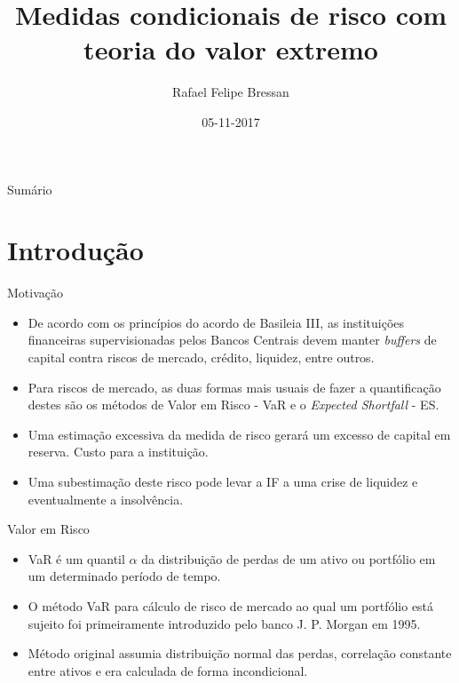 \documentclass[ignorenonframetext,]{beamer}
\title{Medidas condicionais de risco com teoria do valor extremo}
\author{Rafael Felipe Bressan}
\date{05-11-2017}
\providecommand{\tightlist}{%
\setlength{\itemsep}{0pt}\setlength{\parskip}{0pt}}
\begin{document}
\frame{\titlepage}

\section[]{}
\begin{frame}{Sumário}
  \tableofcontents
\end{frame}

\section{Introdução}\label{introducao}

\begin{frame}{Motivação}

\begin{itemize}
\tightlist
\item
  De acordo com os princípios do acordo de Basileia III, as instituições
  financeiras supervisionadas pelos Bancos Centrais devem manter
  \emph{buffers} de capital contra riscos de mercado, crédito, liquidez,
  entre outros.
\item
  Para riscos de mercado, as duas formas mais usuais de fazer a
  quantificação destes são os métodos de Valor em Risco - VaR e o
  \emph{Expected Shortfall} - ES.
\item
  Uma estimação excessiva da medida de risco gerará um excesso de
  capital em reserva. Custo para a instituição.
\item
  Uma subestimação deste risco pode levar a IF a uma crise de liquidez e
  eventualmente a insolvência.
\end{itemize}

\end{frame}

\begin{frame}{Valor em Risco}

\begin{itemize}
\tightlist
\item
  VaR é um quantil \(\alpha\) da distribuição de perdas de um ativo ou
  portfólio em um determinado período de tempo.
\item
  O método VaR para cálculo de risco de mercado ao qual um portfólio
  está sujeito foi primeiramente introduzido pelo banco J. P. Morgan em
  1995.
\item
  Método original assumia distribuição normal das perdas, correlação
  constante entre ativos e era calculada de forma incondicional.
\end{itemize}

\end{frame}
\end{document}
